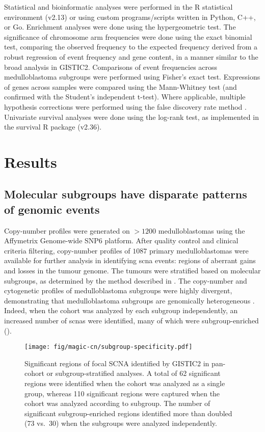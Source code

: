 Statistical and bioinformatic analyses were performed in the R statistical environment (v2.13) or using custom programs/scripts written in Python, C++, or Go. Enrichment analyses were done using the hypergeometric test. The significance of chromosome arm frequencies were done using the exact binomial test, comparing the observed frequency to the expected frequency derived from a robust regression of event frequency and gene content, in a manner similar to the broad analysis in GISTIC2. Comparisons of event frequencies across medulloblastoma subgroups were performed using Fisher's exact test. Expressions of genes across samples were compared using the Mann-Whitney test (and confirmed with the Student's independent t-test). Where applicable, multiple hypothesis corrections were performed using the false discovery rate method . Univariate survival analyses were done using the log-rank test, as implemented in the survival R package (v2.36).

\clearpage

\section{Results}

\subsection{Molecular subgroups have disparate patterns of genomic events}

Copy-number profiles were generated on $> 1200$ medulloblastomas using the Affymetrix Genome-wide SNP6 platform. After quality control and clinical criteria filtering, copy-number profiles of $1087$ primary medulloblastomas were available for further analysis in identifying \gls{scna} events: regions of aberrant gains and losses in the tumour genome. The tumours were stratified based on molecular subgroups, as determined by the method described in . The copy-number and cytogenetic profiles of medulloblastoma subgroups were highly divergent, demonstrating that medulloblastoma subgroups are genomically heterogeneous . Indeed, when the cohort was analyzed by each subgroup independently, an increased number of \gls{scnas} were identified, many of which were subgroup-enriched ().

\begin{SCfigure}[5]
	\centering
	\texttt{[image: fig/magic-cn/subgroup-specificity.pdf]}
	\caption[Significant regions of focal SCNA identified by GISTIC2]
	{
	Significant regions of focal SCNA identified by GISTIC2 in pan-cohort or subgroup-stratified analyses.
	A total of 62 significant regions were identified when the cohort was analyzed as a single group, whereas 110 significant regions were captured when the cohort was analyzed according to subgroup. The number of significant subgroup-enriched regions identified more than doubled (73 vs.\ 30) when the subgroups were analyzed independently.
	}
	\label{fig:subgroup-specificity}
\end{SCfigure}

